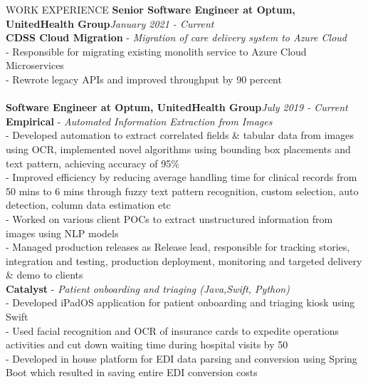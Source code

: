 \documentclass{resume} %
\begin{document}
\begin{rSection}{WORK EXPERIENCE}
{\bf Senior Software Engineer at Optum, UnitedHealth Group}\hfill {\em  January 2021 - Current}
\\ {\bf CDSS Cloud Migration} - {\em Migration of care delivery system to Azure Cloud}
\\ - Responsible for migrating existing monolith service to Azure Cloud Microservices
\\ - Rewrote legacy APIs and improved throughput by 90 percent
\\[-0.9em]
\\{\bf Software Engineer at Optum, UnitedHealth Group}\hfill {\em  July 2019 - Current}
\\ {\bf Empirical} - {\em Automated Information Extraction from Images}
\\ - Developed automation to extract correlated fields \& tabular data from images using OCR, implemented novel algorithms using bounding box placements and text pattern, achieving accuracy of 95\%
\\ - Improved efficiency by reducing average handling time for clinical records from 50 mins to 6 mins through fuzzy text pattern recognition, custom selection, auto detection, column data estimation etc
\\ - Worked on various client POCs to extract unstructured information from images using NLP models
\\- Managed production releases as Release lead, responsible for tracking stories, integration and testing, production deployment, monitoring and targeted delivery \& demo to clients
\\ {\bf Catalyst} - {\em Patient onboarding and triaging (Java,Swift, Python)}
\\ - Developed iPadOS application for patient onboarding and triaging kiosk using Swift
\\ - Used facial recognition and OCR of insurance cards to expedite operations activities and cut down waiting time during hospital visits by 50%
\\ - Developed in house platform for EDI data parsing and conversion using Spring Boot which resulted in saving entire EDI conversion costs

\end{rSection}
\end{document}
